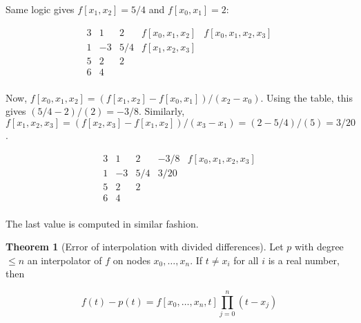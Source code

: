 \documentclass[12pt]{article}
\theoremstyle{definition}
\newtheorem{theorem}{Theorem}
\begin{document}
\begin{shaded}
    Same logic gives $f[x_1, x_2] = 5 / 4$ and $f[x_0, x_1] = 2$:


    \begin{equation*}
        \begin{array}{c|c|c|c|c}
    3 & 1 & 2 & f[x_0,x_1,x_2] & f[x_0,x_1,x_2,x_3] \\
    1 & -3 & 5 / 4 & f[x_1,x_2,x_3] & \\
    5 & 2 & 2 & & \\
    6 & 4 & & & \\
    \end{array}
    \end{equation*}

    Now, $f[x_0, x_1, x_2] = ( f[x_1, x_2] - f[x_0, x_1] ) / ( x_2 - x_0 )$.
    Using the table, this gives $(5 / 4 - 2) / (2) = -3 / 8$. Similarly, 
    $f[x_1, x_2, x_3] = ( f[x_2, x_3] - f[x_1, x_2] ) / (x_3 - x_1) = (2 -
    5 / 4) / \left(5  \right) = 3 / 20$.


    \begin{equation*}
        \begin{array}{c|c|c|c|c}
    3 & 1 & 2 & - 3 / 8 & f[x_0,x_1,x_2,x_3] \\
    1 & -3 & 5 / 4 & 3 / 20 & \\
    5 & 2 & 2 & & \\
    6 & 4 & & & \\
    \end{array}
    \end{equation*}

    The last value is computed in similar fashion.

\end{shaded}

\begin{theorem}[Error of interpolation with divided differences]
    Let $p$ with degree $\leq n$ an interpolator of $f$ on nodes $x_0, \ldots,
    x_n$. If $t \neq x_i$ for all $i$ is a real number, then 

    \begin{equation*}
        f(t) - p(t) = f[x_0, \ldots, x_n, t] \prod_{j=0}^n(t - x_j)
    \end{equation*}
\end{theorem}
\end{document}
